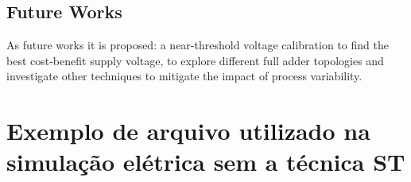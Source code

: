 \documentclass[ecp,tc, english]{iiufrgs}
\begin{document}
\section{Future Works}

As future works it is proposed: a near-threshold voltage calibration to find the best cost-benefit supply voltage, to explore different full adder topologies and investigate other techniques to mitigate the impact of process variability.





\annex
\chapter{Exemplo de arquivo utilizado na simulação elétrica sem a técnica ST}
\end{document}
